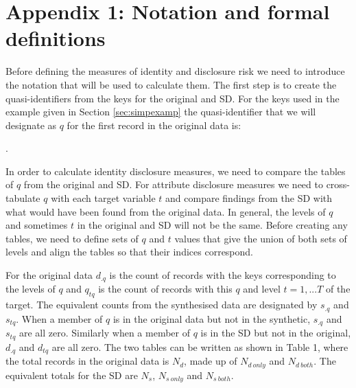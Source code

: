 \documentclass[12pt]{article}
\begin{document}



\section*{Appendix 1: Notation and formal definitions}{\label{sec:app1}}
Before defining the measures of identity and disclosure risk we need to introduce the notation that will be used to calculate them. The first step is to create the quasi-identifiers from the keys for the original and SD. For the keys used in the example given in Section \ref{sec:simpexamp} the quasi-identifier that we will designate as $q$ for the first record in the original data is:



.

In order to calculate identity disclosure measures, we need to compare the tables of $q$ from the original and SD. For attribute disclosure measures we need to cross-tabulate $q$ with each target variable $t$ and compare findings from the SD with what would have been found from the original data. In general, the levels of $q$ and sometimes $t$ in the original and SD will not be the same. Before creating any tables, we need to define sets of $q$ and $t$ values that give the union of both sets of levels and align the tables so that their indices correspond.

For the original data $d_{.q}$ is the count of records with the keys corresponding to the levels of $q$ and $q_{tq}$ is the count of records with this $q$ and level $t=1,...T$ of the target. The equivalent counts from the synthesised data are designated by $s_{.q}$ and $s_{tq}$. When a member of $q$ is in the original data but not in the synthetic, $s_{.q}$ and $s_{tq}$ are all zero. Similarly when a member of $q$ is in the SD but not in the original, $d_{.q}$ and $d_{tq}$ are all zero. The two tables can be written as shown in Table 1, where the total records in the original data is $N_d$, made up of $N_{d~only}$ and $N_{d~both}$. The
equivalent totals for the SD are $N_s$, $N_{s~only}$ and $N_{s~both}$.
\end{document}
